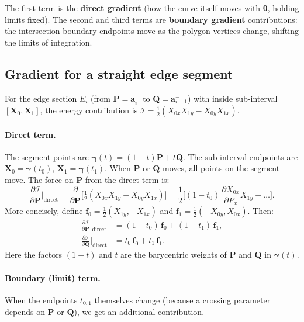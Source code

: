 \documentclass[12pt]{article}
\newcommand{\pderiv}[2]{\frac{\partial #1}{\partial #2}}
\begin{document}
The first term is the \textbf{direct gradient} (how the curve itself moves with
$\boldsymbol{\theta}$, holding limits fixed).  The second and third terms are
\textbf{boundary gradient} contributions: the intersection boundary endpoints move
as the polygon vertices change, shifting the limits of integration.

\subsection{Gradient for a straight edge segment}

For the edge section $E_i$ (from $\mathbf{P} = \mathbf{a}_i^+$ to $\mathbf{Q} = \mathbf{a}_{i+1}^-$)
with inside sub-interval $[\mathbf{X}_0, \mathbf{X}_1]$, the energy contribution is
$\mathcal{I} = \frac{1}{2}(X_{0x}X_{1y} - X_{0y}X_{1x})$.

\paragraph{Direct term.}
The segment points are $\boldsymbol{\gamma}(t) = (1-t)\mathbf{P} + t\mathbf{Q}$.
The sub-interval endpoints are $\mathbf{X}_0 = \boldsymbol{\gamma}(t_0)$,
$\mathbf{X}_1 = \boldsymbol{\gamma}(t_1)$.  When $\mathbf{P}$ or $\mathbf{Q}$ moves,
all points on the segment move.  The force on $\mathbf{P}$ from the direct term is:
\[
  \pderiv{\mathcal{I}}{\mathbf{P}}\bigg|_{\text{direct}}
  = \frac{\partial}{\partial\mathbf{P}}\bigl[\tfrac{1}{2}(X_{0x}X_{1y}-X_{0y}X_{1x})\bigr]
    = \frac{1}{2}\bigl[(1-t_0)\,\frac{\partial X_{0x}}{\partial P_x} X_{1y} - \ldots\bigr].
\]
More concisely, define $\mathbf{f}_0 = \frac{1}{2}(X_{1y}, -X_{1x})$ and
$\mathbf{f}_1 = \frac{1}{2}(-X_{0y}, X_{0x})$.  Then:
\begin{align*}
  \pderiv{\mathcal{I}}{\mathbf{P}}\bigg|_{\text{direct}}
    &= (1-t_0)\,\mathbf{f}_0 + (1-t_1)\,\mathbf{f}_1, \\
  \pderiv{\mathcal{I}}{\mathbf{Q}}\bigg|_{\text{direct}}
    &= t_0\,\mathbf{f}_0 + t_1\,\mathbf{f}_1.
\end{align*}
Here the factors $(1-t)$ and $t$ are the barycentric weights of $\mathbf{P}$ and $\mathbf{Q}$
in $\boldsymbol{\gamma}(t)$.

\paragraph{Boundary (limit) term.}
When the endpoints $t_{0,1}$ themselves change (because a crossing parameter
depends on $\mathbf{P}$ or $\mathbf{Q}$), we get an additional contribution.
\end{document}
